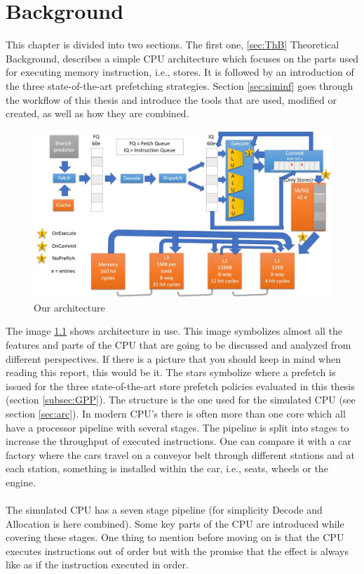 \chapter{Background}
\label{chap:bg}
This chapter is divided into two sections. The first one, \ref{sec:ThB} Theoretical Background,
describes a simple CPU architecture which focuses on the parts used
for executing memory instruction, i.e., stores. It is followed by an introduction of
the three state-of-the-art prefetching strategies. Section \ref{sec:siminf}  goes through the
workflow of this thesis and introduce the tools that are used, modified or created, as
well as how they are combined.

\begin{figure}[h]
\centering
\includegraphics[width=12cm]{figure/thoeratical-arc.jpg}
\caption{Our architecture}
\label{img:arc}
\end{figure}
The image \ref{img:arc} shows architecture in use. This image symbolizes almost all
the features and parts of the CPU that are going to be discussed and analyzed from different
perspectives. If there is a picture that you should keep in mind when reading
this report, this would be it. The stars symbolize where a prefetch is issued for the three state-of-the-art store prefetch policies evaluated in this thesis (section \ref{subsec:GPP}). The structure is the one used for the simulated CPU (see section \ref{sec:arc}). In modern CPU’s there is often more than one core which all have a processor pipeline with several stages. The pipeline is split into stages to increase the throughput of executed instructions. One can compare it with a car factory where the cars travel on a conveyor belt through different stations and
at each station, something is installed within the car, i.e., seats, wheels or the engine.
\\ \\
The simulated CPU has a seven stage pipeline (for simplicity Decode and Allocation is here combined). Some key parts of the CPU are introduced while covering these stages. One thing to mention before moving
on is that the CPU executes instructions out of order but with the promise that the effect
is always like as if the instruction executed in order.
 \\ \\

